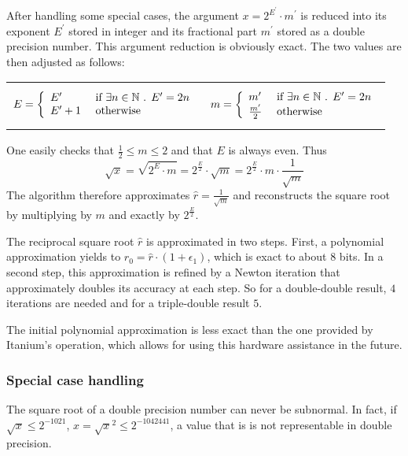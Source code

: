 After handling some special cases, the argument $x = 2^{E^\prime}
\cdot m^\prime$ is reduced into its exponent $E^\prime$ stored in
integer and its fractional part $m^\prime$ stored as a double
precision number.  This argument reduction is obviously exact. The two
values are then adjusted as follows:
\vspace{-3mm}
\begin{center}
  \begin{tabular}{cc}
    \begin{minipage}{60mm}
      $$E = \left \lbrace \begin{array}{ll} E^\prime & \mbox{ if } \exists n \in \mathbb {N} \mbox{ . } E^\prime = 2n\\
          E^\prime +1 & \mbox{ otherwise} \end{array} \right.$$
    \end{minipage}
    &
    \begin{minipage}{60mm}
      $$m = \left \lbrace \begin{array}{ll} m^\prime & \mbox{ if } \exists n \in \mathbb {N} \mbox{ . } E^\prime = 2n \\
          \frac{m^\prime}{2} & \mbox{ otherwise } \end{array} \right.$$
    \end{minipage}
  \end{tabular}
\end{center}
One easily checks that $\frac{1}{2} \leq m \leq 2$ and that $E$ is always even. Thus
$$\sqrt{x} = \sqrt{2^E \cdot m} = 2^{\frac{E}{2}} \cdot \sqrt{m} =
2^{\frac{E}{2}} \cdot m \cdot \frac{1}{\sqrt{m}}$$ The algorithm
therefore approximates $\hat{r} = \frac{1}{\sqrt{m}}$ and reconstructs
the square root by multiplying by $m$ and exactly by
$2^{\frac{E}{2}}$.

The reciprocal square root $\hat{r}$ is approximated in two
steps. First, a polynomial approximation yields to $r_0 = \hat{r}
\cdot \left( 1 + \epsilon_1 \right)$, which is exact to about $8$
bits.  In a second step, this approximation is refined by a Newton
iteration that approximately doubles its accuracy at each step. So for
a double-double result, $4$ iterations are needed and for a
triple-double result $5$.

The initial polynomial approximation is less exact than the one
provided by Itanium's \texttt{} operation, which allows for using this
hardware assistance in the future.

\subsubsection{Special case handling}
The square root of a double precision number can never be
subnormal. In fact, if $\sqrt{x} \leq 2^{-1021}$, $x = \sqrt{x}^2 \leq
2^{-1042441}$, a value that is is not representable in double
precision.

